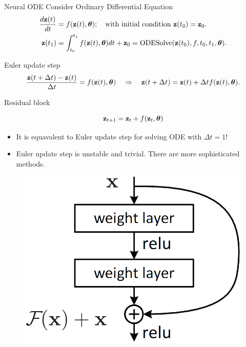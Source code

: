 \begin{frame}{Neural ODE}
	Consider Ordinary Differential Equation    
	\begin{align*}
	    \frac{d \mathbf{z}(t)}{dt} &= f(\mathbf{z}(t), \boldsymbol{\theta}); \quad \text{with initial condition }\mathbf{z}(t_0) = \mathbf{z}_0. \\
	    \mathbf{z}(t_1) &= \int^{t_1}_{t_0} f(\mathbf{z}(t), \boldsymbol{\theta}) d t  + \mathbf{z}_0 = \text{ODESolve}(\mathbf{z}(t_0), f, t_0,t_1, \boldsymbol{\theta}).
	\end{align*}
	\vspace{-0.4cm}
	\begin{block}{Euler update step}
		\vspace{-0.6cm}
		\[
		    \frac{\mathbf{z}(t + \Delta t) - \mathbf{z}(t)}{\Delta t} = f(\mathbf{z}(t), \boldsymbol{\theta}) \quad \Rightarrow \quad \mathbf{z}(t + \Delta t) = \mathbf{z}(t) + \Delta t f(\mathbf{z}(t), \boldsymbol{\theta}).
		\]
		\vspace{-0.7cm}
	\end{block}
	\begin{block}{Residual block}
		\begin{minipage}[t]{0.7\columnwidth}
			\vspace{-0.4cm}
			\[
				\mathbf{z}_{t + 1} = \mathbf{z}_t + f(\mathbf{z}_t, \boldsymbol{\theta})
			\]
			\vspace{-0.6cm}
			\begin{itemize}
				 \item It is equavalent to Euler update step for solving ODE with $\Delta t = 1$!
				 \item Euler update step is unstable and trivial. There are more sophisticated methods.
			\end{itemize}
		\end{minipage}%
		\begin{minipage}[t]{0.3\columnwidth}
			\vspace{-0.2cm}
			\begin{figure}
			    \centering
			    \includegraphics[width=\linewidth]{figs/resnet_1.png}
			\end{figure}
		\end{minipage}
		\vspace{-0.4cm}
	\end{block}

\end{frame}
